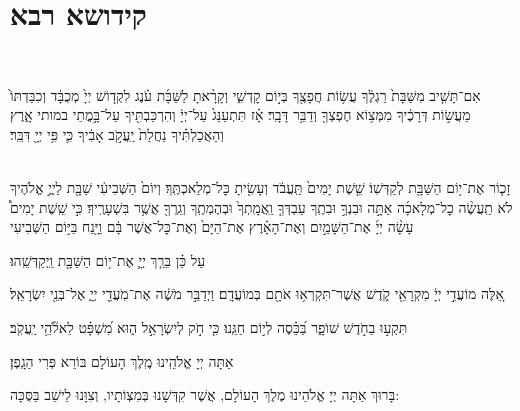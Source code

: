 \documentclass[twoside, openany, parskip=half, 11pt]{book}
\begin{document}
\siyyumshabbatYT

\mournerskaddish

\adonolam

\chapter[קידושא רבא ליו״ט]{ קידושא רבא }

\\\begin{footnotesize}
אִם־תָּשִׁ֤יב מִשַּׁבָּת֙ רַגְלֶ֔ךָ עֲשׂ֥וֹת חֲפָצֶ֖ךָ בְּי֣וֹם קׇדְשִׁ֑י וְקָרָ֨אתָ לַשַּׁבָּ֜ת עֹ֗נֶג לִקְד֤וֹשׁ יְיָ֙ מְכֻבָּ֔ד וְכִבַּדְתּוֹ֙ מֵעֲשׂ֣וֹת דְּרָכֶ֔יךָ מִמְּצ֥וֹא חֶפְצְךָ֖ וְדַבֵּ֥ר דָּבָֽר׃ אָ֗ז תִּתְעַנַּג֙ עַל־יְיָ֔ וְהִרְכַּבְתִּ֖יךָ עַל־בָּ֣מֳתֵי במותי אָ֑רֶץ וְהַאֲכַלְתִּ֗יךָ נַחֲלַת֙ יַֽעֲקֹ֣ב אָבִ֔יךָ כִּ֛י פִּ֥י יְיָ֖ דִּבֵּֽר׃

\veshameru\\
זָכ֛וֹר אֶת־י֥וֹם הַשַּׁבָּ֖ת לְקַדְּשֽׁוֹ׃ שֵׁ֤שֶׁת יָמִים֙ תַּֽעֲבֹ֔ד וְעָשִׂ֖יתָ כׇּל־מְלַאכְתֶּֽךָ׃ וְיוֹם֙ הַשְּׁבִיעִ֔י שַׁבָּ֖ת לַיֽיֳ֣ אֱלֹהֶיךָ לֹא תַֽעֲשֶׂ֨ה כׇל־מְלָאכָ֜ה אַתָּ֣ה וּבִנְךָ֣ וּבִתֶֽךָ עַבְדְּךָ֤ וַֽאֲמָֽתְךָ֙ וּבְהֶמְתֶֽךָ וְגֵֽרְךָ֖ אֲשֶׁ֥ר בִּשְׁעָרֶֽיךָ׃ כִּ֣י שֵֽׁשֶׁת יָמִים֩ עָשָׂ֨ה יְיָ֜ אֶת־הַשָּׁמַ֣יִם וְאֶת־הָאָ֗רֶץ אֶת־הַיָּם֙ וְאֶת־כׇּל־אֲשֶׁר בָּ֔ם וַיָּ֖נַח בַּיּ֣וֹם הַשְּׁבִיעִי\\ \end{footnotesize} עַל כֵּ֗ן בֵּרַ֧ךְ יְיָ֛ אֶת־י֥וֹם הַשַּׁבָּ֖ת וַֽיְקַדְּשֵֽׁהוּ׃

\sepline

  אֵ֚לֶּה מוֹעֲדֵ֣י יְיָ֔ מִקְרָאֵ֖י קֹ֑דֶשׁ אֲשֶׁר־תִּקְרְא֥וּ אֹתָ֖ם בְּמוֹעֲדָֽם׃ וַיְדַבֵּ֣ר מֹשֶׁ֔ה אֶת־מֹֽעֲדֵ֖י יְיָ֑ אֶל־בְּנֵ֖י יִשְׂרָאֵֽל׃

\sepline

  תִּקְע֣וּ בַחֹ֣דֶשׁ שׁוֹפָ֑ר בַּ֝כֵּ֗סֶה לְי֣וֹם חַגֵּֽנוּ׃ כִּ֤י חֹ֣ק לְיִשְׂרָאֵ֣ל ה֑וּא מִ֝שְׁפָּ֗ט לֵאלֹ֘הֵ֥י יַֽעֲקֹֽב׃

\sepline

\savri
{}
אַתָּה יְיָ אֱלֹהֵֽינוּ מֶֽלֶךְ הָעוֹלָם בּוֹרֵא פְּרִי הַגָֽפֶן׃

\sepline

\begin{small}בָּרוּךְ אַתָּה יְיָ אֱלֹהֵינוּ מֶלֶךְ הָעוֹלָם, אֲשֶׁר קִדְּשָׁנוּ בְּמִצְוֹתָיו, וְצִוָּנוּ לֵישֵׁב בַּסֻּכָּה:\end{small} \\
\end{document}
